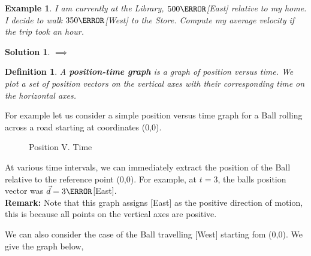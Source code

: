 \documentclass[12pt]{article}
\newcommand{\tx}[1]{\text{#1}}
\theoremstyle{break}
\newtheorem{ex}[thm]{Example}
\newtheorem*{soln}{Solution}
\newtheorem{defn}{Definition}[subsection]
\begin{document}
\begin{ex}
    I am currently at the Library, $500\m$[East] relative to my home. I decide to walk $350\m$[West] to the Store. Compute my average \emph{velocity} if the trip took an hour.
\end{ex}
\begin{soln}
$\implies$
    \vspace*{10cm}
\end{soln}



\newpage

\begin{defn}
    A \textbf{position-time graph} is a graph of position versus time. We plot a set of position vectors on the vertical axes with their corresponding time on the horizontal axes. 
\end{defn}
For example let us consider a simple position versus time graph for a Ball rolling across a road starting at coordinates (0,0). 
\begin{figure}[h]
	\centering
	\caption{Position V. Time}
	\label{fig:my-awesome-graph}
\end{figure}

At various time intervals, we can immediately extract the position of the Ball relative to the reference point (0,0). For example, at $t = 3$, the balls position vector was $\vec d = 3\m$[East].\\

\textbf{Remark: } Note that this graph assigns [East] as the positive direction of motion, this is because all points on the vertical axes are positive.


We can also consider the case of the Ball travelling [West] starting fom (0,0). We give the graph below,


\begin{center}
\end{center}
\end{document}

